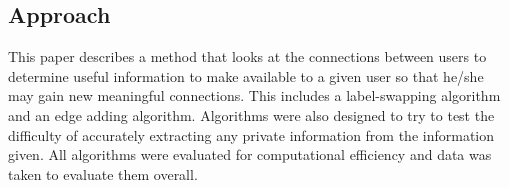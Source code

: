 \subsection{Approach}

\noindent This paper describes a method that looks at the connections between users to determine useful information to make available to a given user so that he/she may gain new meaningful connections. This includes a label-swapping algorithm and an edge adding algorithm. Algorithms were also designed to try to test the difficulty of accurately extracting any private information from the information given. All algorithms were evaluated for computational efficiency and data was taken to evaluate them overall.  \\